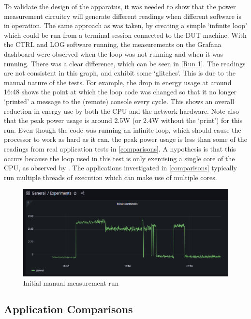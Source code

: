 To validate the design of the apparatus, it was needed to show that the power measurement circuitry will generate different readings when different software is in operation. The same approach as \citet{Kaup2014} was taken, by creating a simple `infinite loop' which could be run from a terminal session connected to the DUT machine. With the CTRL and LOG software running, the measurements on the Grafana dashboard were observed when the loop was not running and when it was running. There was a clear difference, which can be seen in \autoref{Run 1}. The readings are not consistent in this graph, and exhibit some `glitches'. This is due to the manual nature of the tests. For example, the drop in energy usage at around 16:48 shows the point at which the loop code was changed so that it no longer `printed' a message to the (remote) console every cycle. This shows an overall reduction in energy use by both the CPU and the network hardware. Note also that the peak power usage is around 2.5W (or 2.4W without the `print') for this run. Even though the code was running an infinite loop, which should cause the processor to work as hard as it can, the peak power usage is less than some of the readings from real application tests in \autoref{comparisons}. A hypothesis is that this occurs because the loop used in this test is only exercising a single core of the CPU, as  observed by \citet{Basmadjian2012}. The applications investigated in \autoref{comparisons} typically run multiple threads of execution which can make use of multiple cores.

\begin{figure}[htbp]
  \centering
  \includegraphics[width=\columnwidth]{Figures/rig/run1.png}
  \caption{Initial manual measurement run}
  \label{Run 1}
\end{figure}

\subsection{Application Comparisons}
\label{comparisons}


